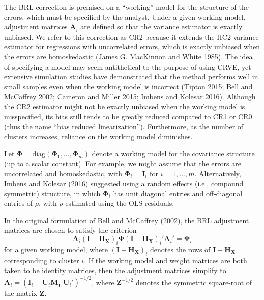 \documentclass[12pt]{article}
\begin{document}
The BRL correction is premised on a ``working'' model for the structure
of the errors, which must be specified by the analyst. Under a given
working model, adjustment matrices \(\mathbf{A}_i\) are defined so that
the variance estimator is exactly unbiased. We refer to this correction
as CR2 because it extends the HC2 variance estimator for regressions
with uncorrelated errors, which is exactly unbiased when the errors are
homoskedastic (James G. MacKinnon and White 1985). The idea of
specifying a model may seem antithetical to the purpose of using CRVE,
yet extensive simulation studies have demonstrated that the method
performs well in small samples even when the working model is incorrect
(Tipton 2015; Bell and McCaffrey 2002; Cameron and Miller 2015; Imbens
and Kolesar 2016). Although the CR2 estimator might not be exactly
unbiased when the working model is misspecified, its bias still tends to
be greatly reduced compared to CR1 or CR0 (thus the name ``bias reduced
linearization''). Furthermore, as the number of clusters increases,
reliance on the working model diminishes.

Let
\(\boldsymbol\Phi = \text{diag}\left(\boldsymbol\Phi_1,...,\boldsymbol\Phi_m\right)\)
denote a working model for the covariance structure (up to a scalar
constant). For example, we might assume that the errors are uncorrelated
and homoskedastic, with \(\boldsymbol\Phi_i = \mathbf{I}_i\) for
\(i = 1,...,m\). Alternatively, Imbens and Kolesar (2016) suggested
using a random effects (i.e., compound symmetric) structure, in which
\(\boldsymbol\Phi_i\) has unit diagonal entries and off-diagonal entries
of \(\rho\), with \(\rho\) estimated using the OLS residuals.

In the original formulation of Bell and McCaffrey (2002), the BRL
adjustment matrices are chosen to satisfy the criterion \begin{equation}
\label{eq:CR2_criterion_BM}
\mathbf{A}_i \left(\mathbf{I} - \mathbf{H_X}\right)_i \boldsymbol\Phi \left(\mathbf{I} - \mathbf{H_X}\right)_i' \mathbf{A}_i'  =  \boldsymbol\Phi_i 
\end{equation} for a given working model, where
\(\left(\mathbf{I} - \mathbf{H_X}\right)_i\) denotes the rows of
\(\mathbf{I} - \mathbf{H_X}\) corresponding to cluster \(i\). If the
working model and weight matrices are both taken to be identity
matrices, then the adjustment matrices simplify to
\(\mathbf{A}_i = \left(\mathbf{I}_i - \mathbf{\ddot{U}}_i \mathbf{M_{\ddot{U}}} \mathbf{\ddot{U}}_i'\right)^{-1/2}\),
where \(\mathbf{Z}^{-1/2}\) denotes the symmetric square-root of the
matrix \(\mathbf{Z}\).
\end{document}
